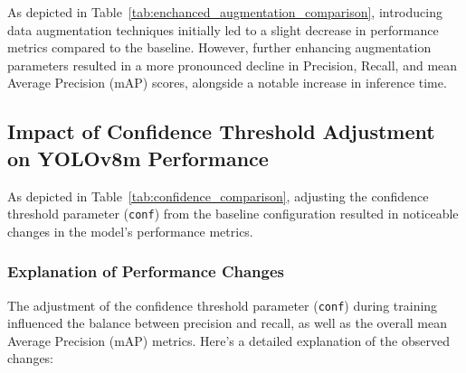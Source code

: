 \documentclass[conference]{IEEEtran}
\begin{document}
As depicted in Table~\ref{tab:enchanced_augmentation_comparison}, introducing data augmentation techniques initially led to a slight decrease in performance metrics compared to the baseline. However, further enhancing augmentation parameters resulted in a more pronounced decline in Precision, Recall, and mean Average Precision (mAP) scores, alongside a notable increase in inference time.

\subsection{Impact of Confidence Threshold Adjustment on YOLOv8m Performance}
As depicted in Table~\ref{tab:confidence_comparison}, adjusting the confidence threshold parameter (\texttt{conf}) from the baseline configuration resulted in noticeable changes in the model's performance metrics.
\begin{table}[htbp]
    \centering
    \caption{Comparison of YOLOv8m Performance with Different Confidence Thresholds}
    \label{tab:confidence_comparison}
\end{table}
\subsubsection{Explanation of Performance Changes}

The adjustment of the confidence threshold parameter (\texttt{conf}) during training influenced the balance between precision and recall, as well as the overall mean Average Precision (mAP) metrics. Here's a detailed explanation of the observed changes:
\end{document}
